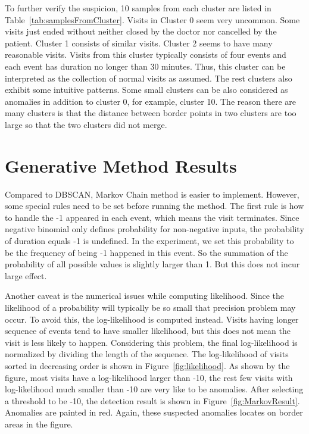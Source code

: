 To further verify the suspicion, 10 samples from each cluster are listed in Table~\ref{tab:samplesFromCluster}. Visits in Cluster 0 seem very uncommon. Some visits just ended without neither closed by the doctor nor cancelled by the patient. Cluster 1 consists of similar visits. Cluster 2 seems to have many reasonable visits. Visits from this cluster typically consists of four events and each event has duration no longer than 30 minutes. Thus, this cluster can be interpreted as the collection of normal visits as assumed. The rest clusters also exhibit some intuitive patterns. Some small clusters can be also considered as anomalies in addition to cluster 0, for example, cluster 10. The reason there are many clusters is that the distance between border points in two clusters are too large so that the two clusters did not merge. 

\section{Generative Method Results}
\label{sec:generative}
Compared to DBSCAN, Markov Chain method is easier to implement. However, some special rules need to be set before running the method. The first rule is how to handle the -1 appeared in each event, which means the visit terminates. Since negative binomial only defines probability for non-negative inputs, the probability of duration equals -1 is undefined. In the experiment, we set this probability to be the frequency of being -1 happened in this event. So the summation of the probability of all possible values is slightly larger than 1. But this does not incur large effect.

Another caveat is the numerical issues while computing likelihood. Since the likelihood of a probability will typically be so small that precision problem may occur. To avoid this, the log-likelihood is computed instead. Visits having longer sequence of events tend to have smaller likelihood, but this does not mean the visit is less likely to happen. Considering this problem, the final log-likelihood is normalized by dividing the length of the sequence. The log-likelihood of visits sorted in decreasing order is shown in Figure~\ref{fig:likelihood}. As shown by the figure, most visits have a log-likelihood larger than -10, the rest few visits with log-likelihood much smaller than -10 are very like to be anomalies. After selecting a threshold to be -10, the detection result is shown in Figure~\ref{fig:MarkovResult}. Anomalies are painted in red. Again, these suspected anomalies locates on border areas in the figure.

